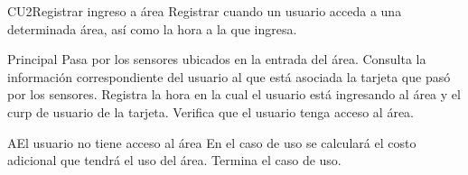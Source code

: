
% 



	\begin{UseCase}{CU2}{Registrar ingreso a área}{
		Registrar cuando un usuario acceda a una determinada área, así como la hora a la que ingresa.
	}
	\end{UseCase}

	\begin{UCtrayectoria}{Principal}
		\UCpaso[\UCactor] Pasa por los sensores ubicados en la entrada del área.    
		\UCpaso Consulta la información correspondiente del usuario al que está asociada la tarjeta que pasó por los sensores.
		\UCpaso Registra la hora en la cual el usuario está ingresando al área y el curp de usuario de la tarjeta.
		\UCpaso Verifica que el usuario tenga acceso al área. 
	\end{UCtrayectoria}

			
		
		\begin{UCtrayectoriaA}{A}{El usuario no tiene acceso al área}
			\UCpaso En el caso de uso  se calculará el costo adicional que tendrá el uso del área.
			\UCpaso[] Termina el caso de uso.
		\end{UCtrayectoriaA}
		
		\
		
